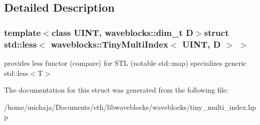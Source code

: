 \subsection{Detailed Description}
\subsubsection*{template$<$class U\+I\+N\+T, waveblocks\+::dim\+\_\+t D$>$struct std\+::less$<$ waveblocks\+::\+Tiny\+Multi\+Index$<$ U\+I\+N\+T, D $>$ $>$}

provides less functor (compare) for S\+T\+L (notable std\+::map) specializes generic std\+::less$<$\+T$>$ 

The documentation for this struct was generated from the following file\+:\begin{DoxyCompactItemize}
\item 
/home/michaja/\+Documents/eth/libwaveblocks/waveblocks/tiny\+\_\+multi\+\_\+index.\+hpp\end{DoxyCompactItemize}
